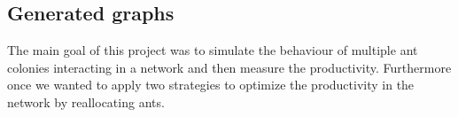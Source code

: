 \subsection{Generated graphs} \label{results1}
The main goal of this project was to simulate the behaviour of multiple ant colonies interacting in a network and then measure the productivity. Furthermore once we wanted to apply two strategies to optimize the productivity in the network by reallocating ants.